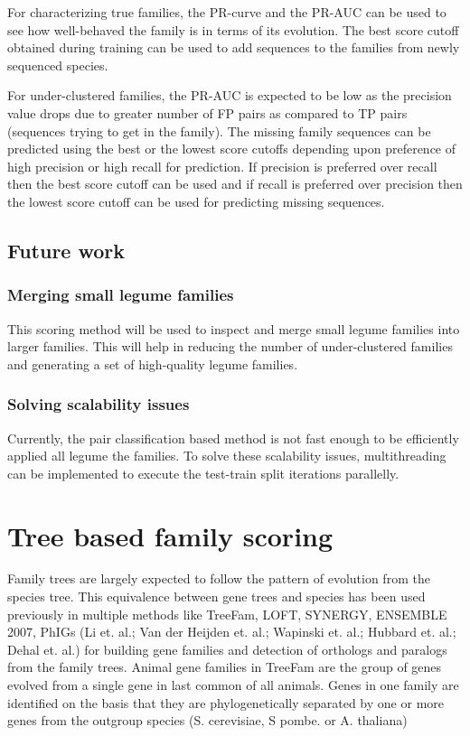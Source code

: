 \documentclass{article}
\begin{document}
		For characterizing true families, the PR-curve and the PR-AUC can be used to see how well-behaved the family is in terms of its evolution. The best score cutoff obtained during training can be used to add sequences to the families from newly sequenced species.
		
		For under-clustered families, the PR-AUC is expected to be low as the precision value drops due to greater number of FP pairs as compared to TP pairs (sequences trying to get in the family). The missing family sequences can be predicted using the best or the lowest score cutoffs depending upon preference of  high precision or high recall for prediction. If precision is preferred over recall then the best score cutoff can be used and if recall is preferred over precision then the lowest score cutoff can be used for predicting missing sequences.
		
		\subsection{Future work}
			\subsubsection{Merging small legume families}
			This scoring method will be used to inspect and merge small legume families into larger families. This will help in reducing the number of under-clustered families and generating a set of high-quality legume families.
			\subsubsection{Solving scalability issues}
			Currently, the pair classification based method is not fast enough to be efficiently applied all legume the families. To solve these scalability issues, multithreading can be implemented to execute the test-train split iterations parallelly. 
			
		
	\section{Tree based family scoring}
	Family trees are largely expected to follow the pattern of evolution from the species tree. This equivalence between gene trees and species has been used previously in multiple methods like TreeFam, LOFT, SYNERGY, ENSEMBLE 2007, PhIGs (Li et. al.; Van der Heijden et. al.; Wapinski et. al.; Hubbard et. al.; Dehal et. al.) for building gene families and detection of orthologs and paralogs from the family trees. Animal gene families in TreeFam are the group of genes evolved from a single gene in last common of all animals. Genes in one family are identified on the basis that they are phylogenetically separated by one or more genes from the outgroup species (S. cerevisiae, S pombe. or A. thaliana)
	
\end{document}
